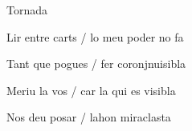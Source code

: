 \documentclass[12pt]{article}
\begin{document}
\begin{estrofaExtra}%




\begin{tornada}

Tornada

\end{tornada}


\end{estrofaExtra}


\begin{estrofa}

 Lir entre carts / lo meu poder no fa

 Tant que pogues / fer coronjnuisibla

 Meriu la vos / car la qui es visibla

 Nos deu posar / lahon miraclasta

\end{estrofa}
\end{document}
